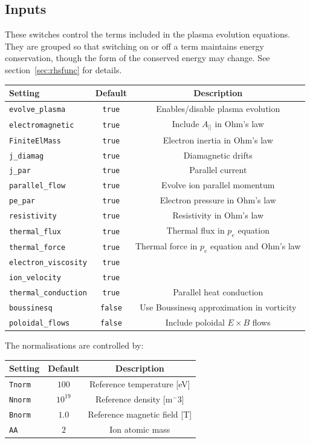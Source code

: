 \documentclass[12pt,a4paper]{article}
\begin{document}
\subsection{Inputs}

These switches control the terms included in the plasma
evolution equations. They are grouped so that switching on
or off a term maintains energy conservation, though the
form of the conserved energy may change. See section~\ref{sec:rhsfunc} for details.
\begin{center}
\begin{tabular}{l c c}
  Setting & Default & Description \\
  \hline
  \texttt{evolve\_plasma}  & \texttt{true} & Enables/disable plasma evolution \\
  \texttt{electromagnetic}  &  \texttt{true} & Include $A_{||}$ in Ohm's law\\
  \texttt{FiniteElMass}  & \texttt{true} & Electron inertia in Ohm's law \\
  \texttt{j\_diamag} & \texttt{true} & Diamagnetic drifts \\
  \texttt{j\_par} & \texttt{true} & Parallel current \\
  \texttt{parallel\_flow} & \texttt{true} & Evolve ion parallel momentum \\
  \texttt{pe\_par} & \texttt{true} & Electron pressure in Ohm's law \\
  \texttt{resistivity} & \texttt{true} & Resistivity in Ohm's law \\
  \texttt{thermal\_flux} & \texttt{true} &  Thermal flux in $p_e$ equation\\
  \texttt{thermal\_force} & \texttt{true} & Thermal force in $p_e$ equation and Ohm's law \\
  \texttt{electron\_viscosity} & \texttt{true} &  \\
  \texttt{ion\_velocity} & \texttt{true} &  \\
  \texttt{thermal\_conduction} & \texttt{true} & Parallel heat conduction \\
  \texttt{boussinesq} & \texttt{false} & Use Boussinesq approximation in vorticity \\
  \texttt{poloidal\_flows} & \texttt{false} & Include poloidal $E\times B$ flows \\
  \hline
\end{tabular}
\end{center}

The normalisations are controlled by:
\begin{center}
\begin{tabular}{l c c}
  Setting & Default & Description \\
  \hline
  \texttt{Tnorm} & $100$ & Reference temperature [eV] \\
  \texttt{Nnorm} & $10^{19}$ & Reference density [m$^-3$] \\
  \texttt{Bnorm} & $1.0$ & Reference magnetic field [T] \\
  \texttt{AA} & $2$ & Ion atomic mass \\
  \hline
\end{tabular}
\end{center}
\end{document}
